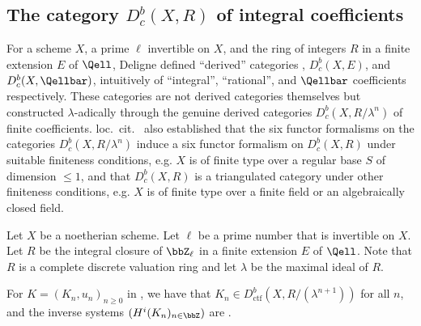 



\subsection{The category \texorpdfstring{$D_c^b(X,R)$}{Dcb(X,R)} of integral coefficients}

For a scheme $X$, a prime $\ell$ invertible on $X$, and the ring of integers $R$ in a finite extension $E$ of $\Qell$, Deligne {\cite[I.I.2]{deligne_lcwii}} defined ``derived'' categories , $D_c^b(X, E)$, and $D_c^b(X, \Qellbar)$, intuitively of ``integral'', ``rational'', and $\Qellbar$ coefficients respectively. These categories are not derived categories themselves but constructed $\lambda$-adically through the genuine derived categories $D_c^b(X,R/\lambda^n)$ of finite coefficients. loc.~cit.~ also established that the six functor formalisms on the categories $D_c^b(X, R/\lambda^n)$ induce a six functor formalism on $D_c^b(X,R)$ under suitable finiteness conditions, e.g. $X$ is of finite type over a regular base $S$ of dimension $\leq 1$, and that $D_c^b(X,R)$ is a triangulated category under other finiteness conditions, e.g. $X$ is of finite type over a finite field or an algebraically closed field.






\begin{proposition}
    Let $X$ be a noetherian scheme. Let $\ell$ be a prime number that is invertible on $X$. Let $R$ be the integral closure of $\bbZ_\ell$ in a finite extension $E$ of $\Qell$. Note that $R$ is a complete discrete valuation ring and let $\lambda$ be the maximal ideal of $R$.

    For $K = (K_n, u_n)_{n \geq 0}$ in , we have that $K_n \in D_{\mathrm{ctf}}^b(X, R/(\lambda^{n+1}))$ for all $n$, and the inverse systems $(H^i(K_n)_{n \in \bbZ})$ are .
\end{proposition}

